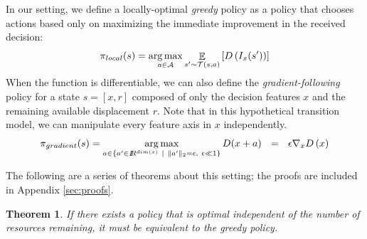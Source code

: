 In our setting, we define a locally-optimal \textit{greedy} policy as a policy that chooses actions based only on maximizing the immediate improvement in the received decision:
\begin{equation}
\label{eq:greedy}
\pi_{local}(s) = \operatorname*{arg\,max}_{a \in \mathcal{A}} \mathop{\mathbb{E}}_{s' \sim \mathcal{T}(s,a)} \left [D\left(I_x(s')\right)\right ]
\end{equation}
When the function is differentiable, we can also define the \textit{gradient-following} policy for a state $s = [x, r]$ composed of only the decision features $x$ and the remaining available displacement $r$. Note that in this hypothetical transition model, we can manipulate every feature axis in $x$ independently.
\begin{equation}
\label{eq:gradient}
\pi_{gradient}(s) = \operatorname*{arg\,max}_{a \in\{a' \in I\!\!R^{dim(x)}~| ~\|a'\|_2 = \epsilon, ~\epsilon \ll 1\} } D(x + a) ~~= ~~ \epsilon \nabla_xD\left(x\right)
\end{equation}

The following are a series of theorems about this setting; the proofs are included in Appendix \ref{sec:proofs}.
\newtheorem{theorem}{Theorem}
\begin{theorem}
\label{gradIsOptimal}
If there exists a policy that is optimal independent of the number of resources remaining, it must be equivalent to the greedy policy.
\end{theorem}

